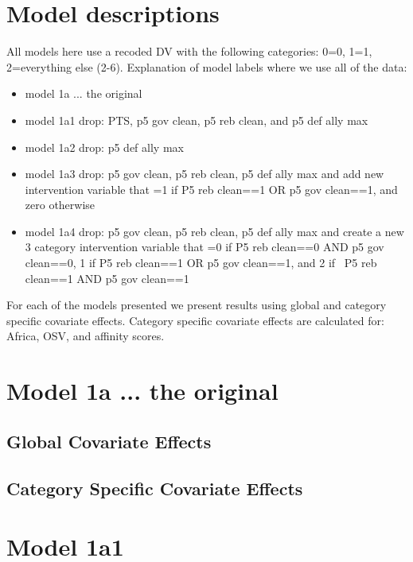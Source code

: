 \documentclass[]{article}
\begin{document}
\tableofcontents

\clearpage

\section{Model descriptions}

All models here use a recoded DV with the following categories: 0=0, 1=1, 2=everything else (2-6). Explanation of model labels where we use all of the data:

\begin{itemize}
	\item model 1a ... the original
	\item model 1a1 drop: PTS, p5 gov clean, p5 reb clean, and p5 def ally max
	\item model 1a2 drop: p5 def ally max
	\item model 1a3 drop: p5 gov clean, p5 reb clean, p5 def ally max and add new intervention variable that =1 if P5 reb clean==1 OR p5 gov clean==1, and zero otherwise
	\item model 1a4 drop: p5 gov clean, p5 reb clean, p5 def ally max and create a new 3 category intervention variable that =0 if P5 reb clean==0 AND p5 gov clean==0, 1 if P5 reb clean==1 OR p5 gov clean==1, and 2 if  P5 reb clean==1 AND p5 gov clean==1
\end{itemize}

For each of the models presented we present results using global and category specific covariate effects. Category specific covariate effects are calculated for: Africa, OSV, and affinity scores.
\clearpage

\section{Model 1a ... the original}
\subsection{Global Covariate Effects}

\clearpage
\subsection{Category Specific Covariate Effects}

\clearpage

\section{Model 1a1}
\end{document}
